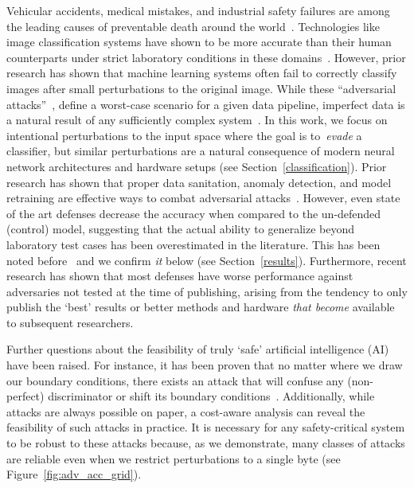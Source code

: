 \documentclass[journal]{IEEEtran}
\newcommand{\cm}[1]{\textit{{\color{blue}#1}}}
\begin{document}
Vehicular accidents, medical mistakes, and industrial safety failures are among the leading causes of preventable death around the world~\cite{OECD, makary2016medical, icoh}. Technologies like image classification systems have shown to be more accurate than their human counterparts under strict laboratory conditions in these domains~\cite{nhtsa, pakdemirli2019artificial, bernal2017safety++}. However, prior research has shown that machine learning systems often fail to correctly classify images after small perturbations to the original image. While these ``adversarial attacks''~\cite{chakraborty_adversarial_2018, biggio_evasion_2013-1}, define a worst-case scenario for a given data pipeline, imperfect data is a natural result of any sufficiently complex system~\cite{pearson2005mining}. In this work, we focus on intentional perturbations to the input space where the goal is to~\emph{evade} a classifier, but similar perturbations are a natural consequence of modern neural network architectures and hardware setups (see Section~\ref{classification}). Prior research has shown that proper data sanitation, anomaly detection, and model retraining are effective ways to combat adversarial attacks~\cite{chakraborty_adversarial_2018,  grigorescu2020survey, li_general_2016, wang_security_2019}. However, even state of the art defenses decrease the accuracy when compared to the un-defended (control) model, suggesting that the actual ability to generalize beyond laboratory test cases has been overestimated in the literature. This has been noted before~\cite{ biggio_evasion_2013, carlini_towards_2017, wang_security_2019, li_general_2016} and we confirm \cm{it} below (see Section~\ref{results}). Furthermore, recent research \cite{croce_reliable_2020} has shown that most defenses have worse performance against adversaries not tested at the time of publishing, arising from the tendency to only publish the `best' results or better methods and hardware \textit{that become} available to subsequent researchers.

Further questions about the feasibility of truly `safe' artificial intelligence (AI) have been raised. For instance, it has been proven that no matter where we draw our boundary conditions, there exists an attack that will confuse any (non-perfect) discriminator or shift its boundary conditions~\cite{dohmatob_generalized_2019}. Additionally, while attacks are always possible on paper, a cost-aware analysis can reveal the feasibility of such attacks in practice. It is necessary for any safety-critical system to be robust to these attacks because, as we demonstrate, many classes of attacks are reliable even when we restrict perturbations to a single byte (see Figure~\ref{fig:adv_acc_grid}). 
\end{document}
